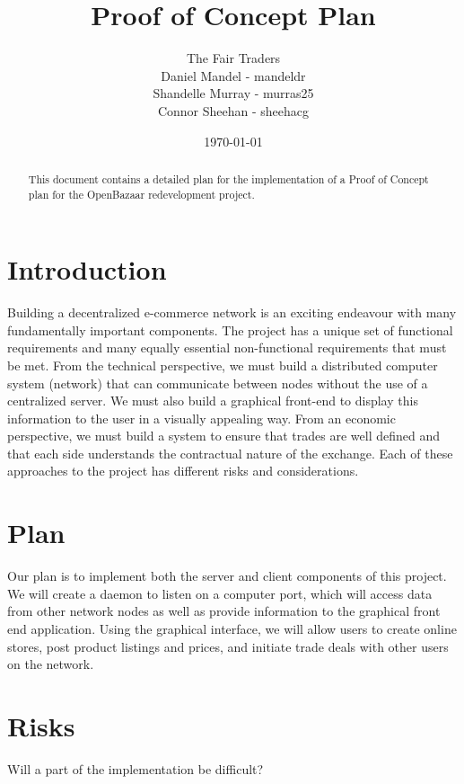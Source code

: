 \documentclass{article}
\begin{document}
\title{Proof of Concept Plan}
\author{The Fair Traders \\ Daniel Mandel - mandeldr \\ Shandelle Murray - murras25 \\ Connor Sheehan - sheehacg}
\date{\today}
\maketitle

\begin{abstract}
This document contains a detailed plan for the implementation of a Proof of Concept plan for the OpenBazaar redevelopment project.
\end{abstract}

\section{Introduction}
Building a decentralized e-commerce network is an exciting endeavour with many fundamentally important components. The project has a unique set of functional requirements and many equally essential non-functional requirements that must be met. From the technical perspective, we must build a distributed computer system (network) that can communicate between nodes without the use of a centralized server. We must also build a graphical front-end to display this information to the user in a visually appealing way. From an economic perspective, we must build a system to ensure that trades are well defined and that each side understands the contractual nature of the exchange. Each of these approaches to the project has different risks and considerations. 

\section{Plan}
Our plan is to implement both the server and client components of this project. We will create a daemon to listen on a computer port, which will access data from other network nodes as well as provide information to the graphical front end application. Using the graphical interface, we will allow users to create online stores, post product listings and prices, and initiate trade deals with other users on the network. 


\section{Risks}
Will a part of the implementation be difficult?
\end{document}
